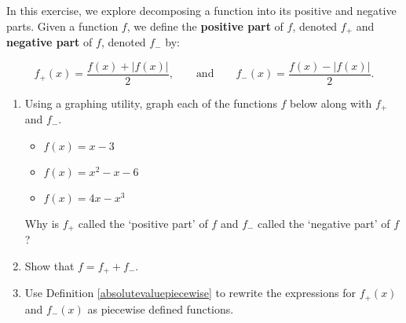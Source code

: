 \documentclass{ximera}
\begin{document}
\begin{problem}\label{posnegdecompexercise}  
In this exercise, we explore decomposing a function into its positive and negative parts.  Given a function $f$, we define the \textbf{positive part} of $f$, denoted $f_{+}$ and \textbf{negative part} of $f$, denoted $f_{-}$ by:

\[ f_{+}(x) = \dfrac{f(x) + |f(x)|}{2}, \qquad \text{and} \qquad f_{-}(x) = \dfrac{f(x) - |f(x)|}{2}. \]

\begin{enumerate}

\item Using a graphing utility, graph each of the functions $f$ below along with $f_{+}$ and $f_{-}$.


\begin{itemize}

\item  $f(x) = x-3$

\item  $f(x) = x^2-x-6$

\item  $f(x) = 4x-x^3$

\end{itemize}


Why is $f_{+}$ called the `positive part' of $f$ and $f_{-}$ called the `negative part' of $f$?

\item Show that $f = f_{+} + f_{-}$.

\item Use Definition \ref{absolutevaluepiecewise} to rewrite the expressions for $f_{+}(x)$ and $f_{-}(x)$ as piecewise defined functions.

\end{enumerate}  
\end{problem} 
\end{document}
